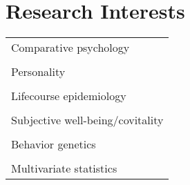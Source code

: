 \documentclass[11pt]{article}
\begin{document}
\section*{Research Interests}
\begin{tabular}{p{15cm}}

Comparative psychology \\ \\

Personality \\ \\

Lifecourse epidemiology \\ \\
  
Subjective well-being/covitality \\ \\

Behavior genetics \\ \\
        
Multivariate statistics

\end{tabular}
\end{document}
